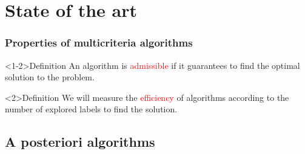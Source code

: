%
%
%
%

\section{State of the art}

\begin{frame} 
\frametitle{Properties of multicriteria algorithms}
\vspace{5mm}
	\begin{block}<1-2>{Definition}
	\vspace{1mm}
	 An algorithm is \textcolor{red}{admissible} if it guarantees to find \textcolor{ao}{the optimal solution} to the problem.
	\vspace{1mm}
	\end{block}
	\vspace{5mm}
	\begin{block}{Definition}
	\vspace{1mm}
    We will measure the \textcolor{red}{efficiency} of algorithms according to the \textcolor{ao}{number of explored labels} to find the solution.
	\vspace{1mm}	
	\end{block}
\end{frame}
\subsection{A posteriori algorithms}

